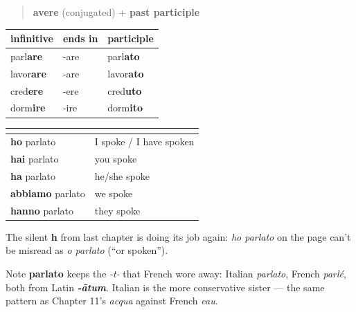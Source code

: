 \begin{grammarlens}[title={Grammar Lens: the compound-past recipe}]
\begin{quote}
\textbf{avere} (conjugated) + \textbf{past participle}
\end{quote}

\noindent
\begin{tabularx}{\linewidth}{@{}>{\raggedright\arraybackslash}X>{\raggedright\arraybackslash}X>{\raggedright\arraybackslash}X@{}}
\toprule
\textbf{infinitive} & \textbf{ends in} & \textbf{participle} \\
\midrule
parl\textbf{are} & -are & parl\textbf{ato} \\
lavor\textbf{are} & -are & lavor\textbf{ato} \\
cred\textbf{ere} & -ere & cred\textbf{uto} \\
dorm\textbf{ire} & -ire & dorm\textbf{ito} \\
\bottomrule
\end{tabularx}

\noindent
\begin{tabularx}{\linewidth}{@{}>{\raggedright\arraybackslash}X>{\raggedright\arraybackslash}X@{}}
\toprule
\textbf{} & \textbf{} \\
\midrule
\textbf{ho} parlato & I spoke / I have spoken \\
\textbf{hai} parlato & you spoke \\
\textbf{ha} parlato & he/she spoke \\
\textbf{abbiamo} parlato & we spoke \\
\textbf{hanno} parlato & they spoke \\
\bottomrule
\end{tabularx}

The silent \textbf{h} from last chapter is doing its job again: \emph{ho parlato} on the page can't be misread as \emph{o parlato} (\textquotedblleft{}or spoken\textquotedblright{}).

Note \textbf{parlato} keeps the \emph{-t-} that French wore away: Italian \emph{parlato}, French \emph{parlé}, both from Latin \emph{\textbf{-ātum}}. Italian is the more conservative sister — the same pattern as Chapter 11's \emph{acqua} against French \emph{eau}.
\end{grammarlens}

